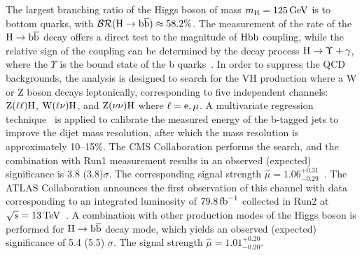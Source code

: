 The largest branching ratio of the Higgs boson of mass $m_{\mathrm{H}}=125\,\text{Ge\hspace{-.08em}V}$ is to bottom quarks, with $\mathcal{BR}(\mathrm{H}\to\mathrm{b}\overline{\mathrm{b}})\approx 58.2\%$. The measurement of the rate of the $\mathrm{H}\to \mathrm{b}\overline{\mathrm{b}}$ decay offers a direct test to the magnitude of $\mathrm{H}\mathrm{b}\mathrm{b}$ coupling, while the relative sign of the coupling can be determined by the decay process $\mathrm{H}\to\Upsilon +\gamma$, where the $\Upsilon$ is the bound state of the b quarks~\cite{Bodwin:2013gca}. 
In order to suppress the QCD backgrounds, the analysis is designed to search for the VH production where a W or Z boson decays leptonically, corresponding to five independent channels: $\mathrm{Z}(\ell\ell)\mathrm{H}$, $\mathrm{W}(\ell\nu)\mathrm{H}$, and $\mathrm{Z}(\nu\nu)\mathrm{H}$ where $\ell=\mathrm{e}, \mu$. A multivariate regression technique~\cite{Aaltonen:2011bp,Khachatryan:2015ota,Aad:2014xzb} is applied to calibrate the measured energy of the b-tagged jets to improve the dijet mass resolution, after which the mass resolution is approximately 10--15\%. The CMS Collaboration performs the search, and the combination with Run1 measurement results in an observed (expected) significance is 3.8 (3.8)$\sigma$. The corresponding signal strength $\hat{\mu}=1.06^{+0.31}_{-0.29}$~\cite{Sirunyan:2017elk}. The ATLAS Collaboration announces the first observation of this channel with data corresponding to an integrated luminosity of $79.8\mbox{\ensuremath{\,\text{fb}^\text{$-$1}}}$ collected in Run2 at $\sqrt{s}=13\,\text{Te\hspace{-.08em}V}$~\cite{ATLAS-CONF-2018-036}. A combination with other production modes of the Higgs boson is performed for $\mathrm{H}\to \mathrm{b}\overline{\mathrm{b}}$ decay mode, which yields an observed (expected) significance of 5.4 (5.5) $\sigma$. The signal strength $\hat{\mu}=1.01^{+0.20}_{-0.20}$.


